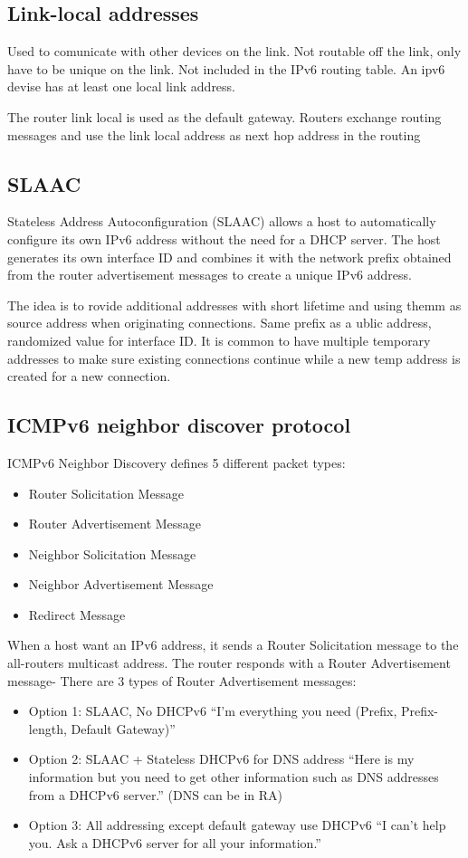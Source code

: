\subsection{Link-local addresses}
Used to comunicate with other devices on the link. Not routable off the link, only have to be unique on the link. Not included in the IPv6 routing table. An ipv6 devise has at least one local link address.

The router link local is used as the default gateway. Routers exchange routing messages and use the link local address as next hop address in the routing

\subsection{SLAAC}
Stateless Address Autoconfiguration (SLAAC) allows a host to 
automatically configure its own IPv6 address without the need
for a DHCP server. The host generates its own interface ID and
combines it with the network prefix obtained from the router 
advertisement messages to create a unique IPv6 address.

The idea is to rovide additional addresses with short lifetime and using themm as source address when 
originating connections. Same prefix as a ublic address, randomized value for interface ID.
It is common to have multiple temporary addresses to make sure existing connections
continue while a new temp address is created for a new connection.



\subsection{ICMPv6 neighbor discover protocol}
ICMPv6 Neighbor Discovery defines 5 different packet types:


\begin{itemize}
    \item Router Solicitation Message
    \item Router Advertisement Message
    \item Neighbor Solicitation Message
    \item Neighbor Advertisement Message
    \item Redirect Message
\end{itemize}

When a host want an IPv6 address, it sends a Router Solicitation message to the all-routers multicast address. The router responds with a Router Advertisement message-
There are 3 types of Router Advertisement messages:
\begin{itemize}
    \item Option 1: SLAAC, No DHCPv6 “I’m everything you need (Prefix, Prefix-length, Default Gateway)”
    \item Option 2: SLAAC + Stateless DHCPv6 for DNS address “Here is my information but you need to get other information such as DNS
            addresses from a DHCPv6 server.” (DNS can be in RA)
    \item Option 3: All addressing except default gateway use DHCPv6
“I can’t help you. Ask a DHCPv6 server for all your information.”
\end{itemize}


